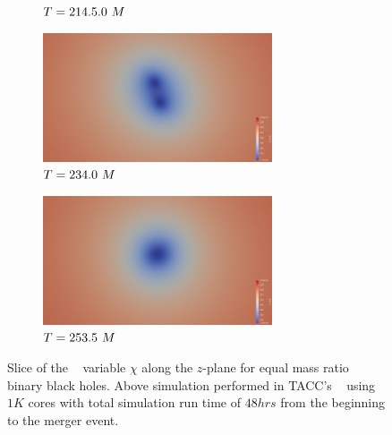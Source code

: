 \documentclass[landscape]{a0poster}
\begin{document}
\begin{textblock}{62}
\begin{textblock}{40}
\begin{figure}
\begin{subfigure}{0.0714\textwidth}
			\caption{\small ${T}=214.5.0~M$}
		\end{subfigure}
		\begin{subfigure}{0.0714\textwidth}
			\centering
			\includegraphics[height=1.5in]{figs/AE/r1/img_slice_000120.png}
			\caption{\small ${T}=234.0~M$}
		\end{subfigure}
		\begin{subfigure}{0.0714\textwidth}
			\centering
			\includegraphics[height=1.5in]{figs/AE/r1/img_slice_000130.png}
			\caption{\small ${T}=253.5~M$}
		\end{subfigure}
	\caption{Slice of the \BSSN~ variable $\chi$ along the $z$-plane for equal mass ratio binary black holes. Above simulation performed in TACC's \Stampede~ using $1K$ cores with total simulation run time of $48hrs$ from the beginning to the merger event.  }
	\end{figure}
\end{textblock}


\end{textblock}
\end{document}
